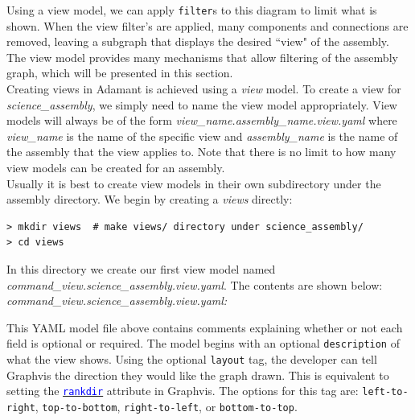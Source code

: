 Using a view model, we can apply \texttt{filter}s to this diagram to limit what is shown. When the view filter's are applied, many components and connections are removed, leaving a subgraph that displays the desired ``view" of the assembly. The view model provides many mechanisms that allow filtering of the assembly graph, which will be presented in this section. \\

Creating views in Adamant is achieved using a \textit{view} model. To create a view for \textit{science\_assembly}, we simply need to name the view model appropriately. View models will always be of the form \textit{view\_name.assembly\_name.view.yaml} where \textit{view\_name} is the name of the specific view and \textit{assembly\_name} is the name of the assembly that the view applies to. Note that there is no limit to how many view models can be created for an assembly. \\

Usually it is best to create view models in their own subdirectory under the assembly directory. We begin by creating a \textit{views} directly:

\vspace{5mm} %
\begin{verbatim}
> mkdir views  # make views/ directory under science_assembly/
> cd views 
\end{verbatim}
\vspace{5mm} %

In this directory we create our first view model named \textit{command\_view.science\_assembly.view.yaml}. The contents are shown below: \\

\textit{command\_view.science\_assembly.view.yaml:}

This YAML model file above contains comments explaining whether or not each field is optional or required. The model begins with an optional \texttt{description} of what the view shows. Using the optional \texttt{layout} tag, the developer can tell Graphvis the direction they would like the graph drawn. This is equivalent to setting the \href{https://www.graphviz.org/doc/info/attrs.html#d:rankdir}{\textcolor{blue}{\texttt{rankdir}}} attribute in Graphvis. The options for this tag are: \texttt{left-to-right}, \texttt{top-to-bottom}, \texttt{right-to-left}, or \texttt{bottom-to-top}. \\

